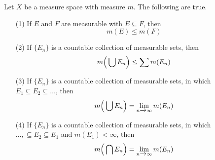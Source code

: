 \begin{theorem}\label{theorem_1.2.2}
    Let $X$ be a measure space with measure $m$. The following are true.
    \begin{enumerate}
        \item[(1)] If $E$ and $F$ are measurable with $E \subseteq F$, then
            \begin{equation*}
                m(E) \leq m(F)
            \end{equation*}

        \item[(2)] If $\{E_n\}$ is a countable collection of measurable sets,
            then
            \begin{equation*}
                m\Big{(} \bigcup{E_n} \Big{)} \leq \sum{m(E_n)}
            \end{equation*}

        \item[(3)] If $\{E_n\}$ is a countable collection of measurable sets, in
            which $E_1 \subseteq E_2 \subseteq \dots$, then
            \begin{equation*}
                m\Big{(} \bigcup{E_n} \Big{)}=\lim_{n \xrightarrow{}
                \infty}{m(E_n)}
            \end{equation*}

        \item[(4)] If $\{E_n\}$ is a countable collection of measurable sets, in
            which $\dots, \subseteq E_2 \subseteq E_1$ and $m(E_1)<\infty$, then
            \begin{equation*}
                m\Big{(} \bigcap{E_n} \Big{)}=\lim_{n \xrightarrow{}
                \infty}{m(E_n)}
            \end{equation*}
    \end{enumerate}
\end{theorem}
